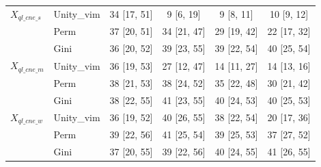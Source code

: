 \begin{tabular}{llcccc}
$X_{ql\_cne\_s}$ & Unity\_vim & 34 [17, 51] & 9 [6, 19] & 9 [8, 11] & 10 [9, 12]\\
 & Perm & 37 [20, 51] & 34 [21, 47] & 29 [19, 42] & 22 [17, 32]\\
 & Gini & 36 [20, 52] & 39 [23, 55] & 39 [22, 54] & 40 [25, 54]\\
$X_{ql\_cne\_m}$ & Unity\_vim & 36 [19, 53] & 27 [12, 47] & 14 [11, 27] & 14 [13, 16]\\
 & Perm & 38 [21, 53] & 38 [24, 52] & 35 [22, 48] & 30 [21, 42]\\
 & Gini & 38 [22, 55] & 41 [23, 55] & 40 [24, 53] & 40 [25, 53]\\
$X_{ql\_cne\_w}$ & Unity\_vim & 36 [19, 52] & 40 [26, 55] & 38 [22, 54] & 20 [17, 36]\\
 & Perm & 39 [22, 56] & 41 [25, 54] & 39 [25, 53] & 37 [27, 52]\\
 & Gini & 37 [20, 55] & 39 [22, 56] & 40 [24, 55] & 41 [26, 55]\\
\bottomrule
\end{tabular}

